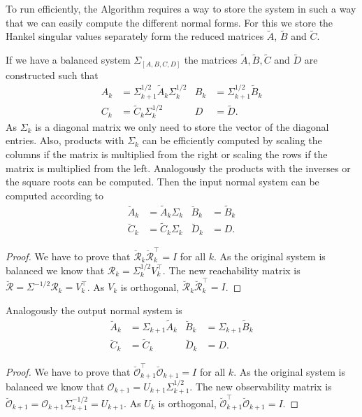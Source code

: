 \documentclass[doctype=mastersthesis,BCOR=15mm,biblatex]{ldvbook}%
\newcommand{\R}{\mathcal{R}} %
\newcommand{\Ob}{\mathcal{O}} %
\newcommand{\eye}{I} %
\begin{document}
To run efficiently, the Algorithm requires a way to store the system in such a way that we can easily compute the different normal forms.
For this we store the Hankel singular values separately form the reduced matrices $\tilde{A}$, $\tilde{B}$ and $\tilde{C}$.

If we have a balanced system $\Sigma_{[A,B,C,D]}$ the matrices $\tilde{A},\tilde{B},\tilde{C}$ and $\tilde{D}$ are constructed such that 
\begin{subequations}
	\begin{align}
	A_k &= \Sigma_{k+1}^{1/2} \tilde{A}_k \Sigma_k^{1/2} &
	B_k &= \Sigma_{k+1}^{1/2} \tilde{B}_k \\
	C_k &= \tilde{C}_k \Sigma_k^{1/2} & 
	D&=\tilde{D}
	.
	\end{align}\label{eq:stages_sigma}
\end{subequations}
As $\Sigma_k$ is a diagonal matrix we only need to store the vector of the diagonal entries.
Also, products with $\Sigma_k$ can be efficiently computed by scaling the columns if the matrix is multiplied from the right or scaling the rows if the matrix is multiplied from the left.
Analogously the products with the inverses or the square roots can be computed.
Then the input normal system can be computed according to
\begin{subequations}
	\begin{align}
	\breve{A}_k &=  \tilde{A}_k \Sigma_k &
	\breve{B}_k &=  \tilde{B}_k \\
	\breve{C}_k &= \tilde{C}_k \Sigma_k & 
	\breve{D}_k &= D
	.
	\end{align}
\end{subequations}
\begin{proof}
	We have to prove that $\breve{\R}_k \breve{\R}_k^\top = \eye$ for all $k$.
	As the original system is balanced we know that $\R_k = \Sigma_k^{1/2} V_k^\top$.
	The new reachability matrix is $\breve{\R} = \Sigma^{-1/2} \R_{k} = V_k^\top$.
	As $V_k$ is orthogonal, $\breve{\R}_k \breve{\R}_k^\top = \eye$.
\end{proof}
Analogously the output normal system is
\begin{subequations}
	\begin{align}
	\breve{A}_k &= \Sigma_{k+1} \tilde{A}_k  &
	\breve{B}_k &= \Sigma_{k+1} \tilde{B}_k \\
	\breve{C}_k &= \tilde{C}_k  & 
	\breve{D}_k &=D
	.
	\end{align}
\end{subequations}
\begin{proof}
	We have to prove that $\breve{\Ob}_{k+1}^\top \breve{\Ob}_{k+1} = \eye$ for all $k$.
	As the original system is balanced we know that $\Ob_{k+1} = U_{k+1} \Sigma_{k+1}^{1/2}$.
	The new observability matrix is $\breve{\Ob}_{k+1} = \Ob_{k+1} \Sigma_{k+1}^{-1/2} = U_{k+1}$.
	As $U_k$ is orthogonal, $\breve{\Ob}_{k+1}^\top \breve{\Ob}_{k+1} = \eye$.
\end{proof}
\end{document}

